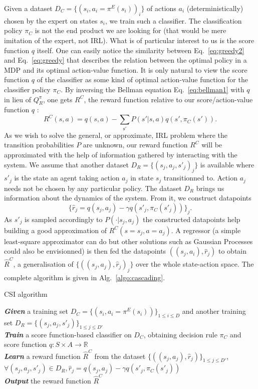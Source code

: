 \documentclass[smallextended]{svjour3}
\begin{document}
Given a dataset $D_C = \{(s_i,a_i=\pi^E(s_i))_i\}$ of actions $a_i$ (deterministically) chosen by the expert on states $s_i$, we train such a classifier. The classification policy $\pi_C$ is not the end product we are looking for (that would be mere imitation of the expert, not IRL). What is of particular interest to us is the score function $q$ itself. One can easily notice the similarity between Eq.~\ref{eq:greedy2} and Eq.~\ref{eq:greedy} that describes the relation between the optimal policy in a MDP and its optimal action-value function. It is only natural to view the score function $q$ of the classifier as some kind of optimal action-value function for the classifier policy $\pi_C$. By inversing the Bellman equation Eq.~\ref{eq:bellman1} with $q$ in lieu of $Q^\pi_R$, one gets $R^C$, the reward function relative to our score/action-value function $q$ :
\begin{equation}
  \label{eq:rc}
  R^C(s,a) =q(s,a) - \sum_{\mathrm{s'}}P(s'|s,a)q(s',\pi_C(s')).
\end{equation}
As we wish to solve the general, or approximate, IRL problem where the transition probabilities $P$ are unknown, our reward function $R^C$ will be approximated with the help of information gathered by interacting with the system. We assume that another dataset $D_R = \{(s_j,a_j,s'_j)_j\}$ is available where $s'_j$ is the state an agent taking action $a_j$ in state $s_j$ transitionned to. Action $a_j$ needs not be chosen by any particular policy. The dataset $D_R$ brings us information about the dynamics of the system. From it, we construct datapoints
\begin{equation}
  \label{eq:rj}
  \{\hat r_j = q(s_j,a_j) - \gamma q(s'_j,\pi_C(s'_j))\}_j.
\end{equation}
As $s'_j$ is sampled accordingly to $P(\cdot|s_j,a_j)$ the constructed datapoints help building a good approximation of $R^C(s=s_j,a=a_j)$. A regressor (a simple least-square approximator can do but other solutions such as Gaussian Processes \cite{rasmussen2006gaussian} could also be envisionned) is then fed the datapoints $((s_j,a_i),\hat r_j)$ to obtain $\hat R^C$, a generalisation of $\{((s_j,a_j),\hat r_j)_j\}$ over the whole state-action space. The complete algorithm is given in Alg.~\ref{algo:cascading}.
\begin{algorithm}%
  \caption{CSI algorithm}
  \label{algo:cascading}
  \emph{\textbf{Given}} a training set $D_C=\{(s_i,a_i=\pi^E(s_i))\}_{1\leq i \leq D}$ and another training set $D_R=\{(s_{j},a_{j},s'_{j})\}_{1\leq j \leq D'}$\;\\
  \emph{\textbf{Train}} a score function-based classifier on $D_C$, obtaining decision rule $\pi_C$ and score function $q:S\times A \rightarrow \mathbb R$\;\\
  \emph{\textbf{Learn}} a reward function $\hat R^C$ from the dataset $\{((s_{j},a_{j}),\hat{r}_j)\}_{1\leq j \leq D'}$, $\forall (s_j,a_j,s'_j) \in D_R,\hat{r}_j=q(s_{j},a_{j})-\gamma q(s'_{j},\pi_C(s'_{j}))$\;\\
  \emph{\textbf{Output}} the reward function $\hat R^{C}$ \;
\end{algorithm}
\end{document}
